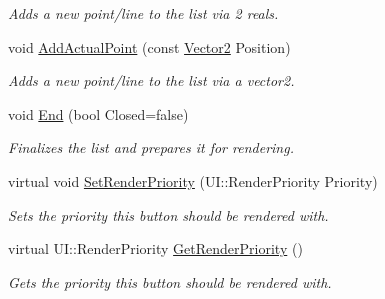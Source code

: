 \begin{DoxyCompactItemize}
\begin{DoxyCompactList}\small\item\em Adds a new point/line to the list via 2 reals. \item\end{DoxyCompactList}\item 
void \hyperlink{classphys_1_1UI_1_1LineList_ab867e29dafa4e512f2ab655388214a96}{AddActualPoint} (const \hyperlink{classphys_1_1Vector2}{Vector2} Position)
\begin{DoxyCompactList}\small\item\em Adds a new point/line to the list via a vector2. \item\end{DoxyCompactList}\item 
void \hyperlink{classphys_1_1UI_1_1LineList_a8ea40817665ec539b4ff97a64b73317f}{End} (bool Closed=false)
\begin{DoxyCompactList}\small\item\em Finalizes the list and prepares it for rendering. \item\end{DoxyCompactList}\item 
virtual void \hyperlink{classphys_1_1UI_1_1LineList_aa108c16282875850e5a6c01353977e97}{SetRenderPriority} (UI::RenderPriority Priority)
\begin{DoxyCompactList}\small\item\em Sets the priority this button should be rendered with. \item\end{DoxyCompactList}\item 
virtual UI::RenderPriority \hyperlink{classphys_1_1UI_1_1LineList_a95aa150344304a49d8f6c6024d6a5351}{GetRenderPriority} ()
\begin{DoxyCompactList}\small\item\em Gets the priority this button should be rendered with. \item\end{DoxyCompactList}\end{DoxyCompactItemize}
